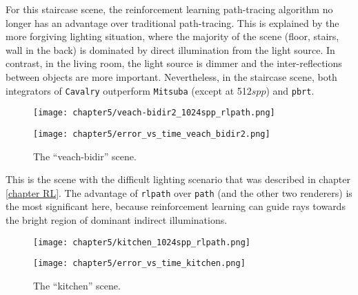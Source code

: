 For this staircase scene, the reinforcement learning path-tracing algorithm no longer has an advantage over traditional path-tracing. This is explained by the more forgiving lighting situation, where the majority of the scene (floor, stairs, wall in the back) is dominated by direct illumination from the light source. In contrast, in the living room, the light source is dimmer and the inter-reflections between objects are more important. Nevertheless, in the staircase scene, both integrators of \texttt{Cavalry} outperform \texttt{Mitsuba} (except at 512$spp$) and \texttt{pbrt}. 

\newpage
\begin{figure}[H]
    \centering
    
    \begin{minipage}[t]{.99\textwidth}
        \centering
        \vspace{0pt}
        \texttt{[image: chapter5/veach-bidir2\_1024spp\_rlpath.png]}
    \end{minipage}
    
    \vspace{0.3cm}

    \begin{minipage}[t]{.99\textwidth}
        \centering
        \vspace{0pt}
        \texttt{[image: chapter5/error\_vs\_time\_veach\_bidir2.png]}
    \end{minipage}
    
    \caption{The ``veach-bidir'' scene.}
\end{figure}

This is the scene with the difficult lighting scenario that was described in chapter \ref{chapter RL}. The advantage of \texttt{rlpath} over \texttt{path} (and the other two renderers) is the most significant here, because reinforcement learning can guide rays towards the bright region of dominant indirect illuminations.


\newpage
\begin{figure}[H]
    \centering
    
    \begin{minipage}[t]{.99\textwidth}
        \centering
        \vspace{0pt}
        \texttt{[image: chapter5/kitchen\_1024spp\_rlpath.png]}
    \end{minipage}
    
    \vspace{0.3cm}

    \begin{minipage}[t]{.99\textwidth}
        \centering
        \vspace{0pt}
        \texttt{[image: chapter5/error\_vs\_time\_kitchen.png]}
    \end{minipage}
    
    \caption{The ``kitchen'' scene.}
\end{figure}

